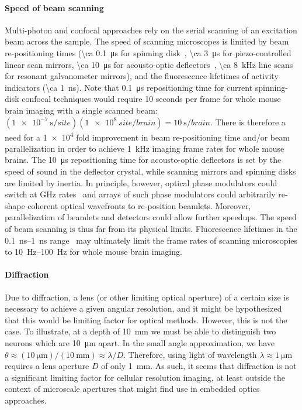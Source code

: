 \paragraph{Speed of beam scanning}
Multi-photon and confocal approaches rely on the serial scanning of an excitation beam across the sample.
The speed of scanning microscopes is limited by beam re-positioning times (\SI{\ca 0.1}{\micro\second} for spinning disk~\cite{mahalati13,kang10,flusberg05}, \SI{\ca 3}{\micro\second} for piezo-controlled linear scan mirrors, \SI{\ca 10}{\micro\second} for acousto-optic deflectors~\cite{vucinic07}, \SI{\ca 8}{\kilo\hertz} line scans for resonant galvanometer mirrors), and the fluorescence lifetimes of activity indicators (\SI{\ca 1}{\nano\second}).
Note that \SI{0.1}{\micro\second} repositioning time for current spinning-disk confocal techniques would require 10 seconds per frame for whole mouse brain imaging with a single scanned beam: $\left(\SI{1e-7}{\second\per site}\right)\left(\SI{1e8}{site\per brain}\right) = \SI{10}{\second\per brain}$. There is therefore a need for a \num{1e4} fold improvement in beam re-positioning time and/or beam parallelization in order to achieve \SI{1}{\kilo\hertz} imaging frame rates for whole mouse brains.
The \SI{10}{\micro\second} repositioning time for acousto-optic deflectors is set by the speed of sound in the deflector crystal, while scanning mirrors and spinning disks are limited by inertia.
In principle, however, optical phase modulators could switch at GHz rates~\cite{alivisatos13} and arrays of such phase modulators could arbitrarily re-shape coherent optical wavefronts to re-position beamlets.
Moreover, parallelization of beamlets and detectors could allow further speedups.
The speed of beam scanning is thus far from its physical limits.
Fluorescence lifetimes in the \SIrange{0.1}{1}{\nano\second} range~\cite{striker99} may ultimately limit the frame rates of scanning microscopies to \SIrange{10}{100}{\hertz} for whole mouse brain imaging.

\paragraph{Diffraction}
Due to diffraction, a lens (or other limiting optical aperture) of a certain size is necessary to
achieve a given angular resolution, and it might be hypothesized that this would be limiting
factor for optical methods.
However, this is not the case.
To illustrate, at a depth of \SI{10}{\milli\meter} we must be able to distinguish two neurons which are \SI{10}{\micro\meter} apart.
In the small angle approximation, we have $\theta \approx (\SI{10}{\micro\meter})/(\SI{10}{\milli\meter}) \approx \lambda/D$. Therefore, using light of wavelength $\lambda\approx\SI{1}{\micro\meter}$ requires a lens aperture $D$ of only \SI{1}{\milli\meter}.
As such, it seems that diffraction is not a significant limiting factor for cellular resolution imaging, at least outside the context of microscale apertures that might find use in embedded optics approaches.


